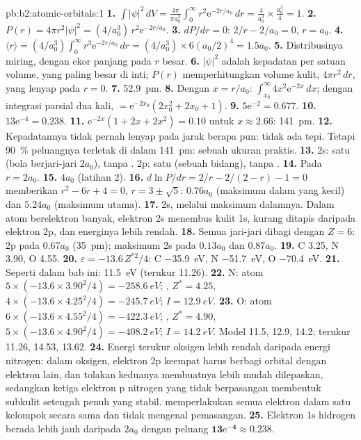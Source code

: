 \begin{solution}{pb:b2:atomic-orbitals:1}
\textbf{1.} $\int|\psi|^2\,dV = \frac{4\pi}{\pi a_0^3}\int_0^\infty r^2\mathrm e^{-2r/a_0}\,dr =
\frac{4}{a_0^3} \times \frac{a_0^3}{4} = 1$.
\textbf{2.} $P(r) = 4\pi r^2|\psi|^2 = (4/a_0^3)\,r^2\mathrm e^{-2r/a_0}$.
\textbf{3.} $dP/dr = 0$: $2/r - 2/a_0 = 0$, $r = a_0$.
\textbf{4.} $\langle r\rangle = (4/a_0^3)\int_0^\infty r^3\mathrm e^{-2r/a_0}\,dr = (4/a_0^3)
\times 6(a_0/2)^4 = 1.5a_0$.
\textbf{5.} Distribusinya miring, dengan ekor panjang pada $r$ besar.
\textbf{6.} $|\psi|^2$ adalah kepadatan per satuan volume, yang paling besar
di inti; $P(r)$ memperhitungkan volume kulit, $4\pi r^2\,dr$, yang lenyap
pada $r = 0$.
\textbf{7.} \qty{52.9}{pm}.
\textbf{8.} Dengan $x = r/a_0$: $\int_{x_0}^\infty 4x^2\mathrm e^{-2x}\,dx$;
dengan integrasi parsial dua kali, $= \mathrm e^{-2x_0}(2x_0^2 + 2x_0 + 1)$.
\textbf{9.} $5\mathrm e^{-2} = 0.677$.
\textbf{10.} $13\mathrm e^{-4} = 0.238$.
\textbf{11.} $\mathrm e^{-2x}(1 + 2x + 2x^2) = 0.10$ untuk $x \approx 2.66$:
\qty{141}{pm}.
\textbf{12.} Kepadatannya tidak pernah lenyap pada jarak berapa pun: tidak
ada tepi. Tetapi 90~\% peluangnya terletak di dalam \qty{141}{pm}: sebuah
ukuran praktis.
\textbf{13.} 2s: satu  (bola berjari-jari $2a_0$), tanpa . 2p: satu  (sebuah bidang), tanpa .
\textbf{14.} Pada $r = 2a_0$.
\textbf{15.} $4a_0$ (latihan 2).
\textbf{16.} $d\ln P/dr = 2/r - 2/(2 - r) - 1 = 0$ memberikan $r^2 - 6r + 4 = 0$,
$r = 3 \pm \sqrt5$: $0.76a_0$ (maksimum dalam yang kecil) dan $5.24a_0$
(maksimum utama).
\textbf{17.} 2s, melalui maksimum dalamnya. Dalam atom berelektron banyak,
elektron 2s menembus kulit 1s, kurang ditapis daripada elektron 2p, dan
energinya lebih rendah.
\textbf{18.} Semua jari-jari dibagi dengan $Z = 6$: 2p pada $0.67a_0$
(\qty{35}{pm}); maksimum 2s pada $0.13a_0$ dan $0.87a_0$.
\textbf{19.} C 3.25, N 3.90, O 4.55.
\textbf{20.} $\varepsilon = -13.6\,Z^{*2}/4$: C \qty{-35.9}{eV}, N \qty{-51.7}{eV}, O
\qty{-70.4}{eV}.
\textbf{21.} Seperti dalam bab ini: \qty{11.5}{eV} (terukur 11.26).
\textbf{22.} N: atom $5 \times (-13.6 \times 3.90^2/4) = \qty{-258.6}{eV}$; , $Z^* =
4.25$, $4 \times (-13.6 \times 4.25^2/4) = \qty{-245.7}{eV}$; $I = \qty{12.9}{eV}$.
\textbf{23.} O: atom $6 \times (-13.6 \times 4.55^2/4) = \qty{-422.3}{eV}$; , $Z^* =
4.90$, $5 \times (-13.6 \times 4.90^2/4) = \qty{-408.2}{eV}$; $I = \qty{14.2}{eV}$.
Model 11.5, 12.9, 14.2; terukur 11.26, 14.53, 13.62.
\textbf{24.} Energi terukur oksigen lebih rendah daripada energi nitrogen:
dalam oksigen, elektron 2p keempat harus berbagi orbital dengan elektron
lain, dan tolakan keduanya membuatnya lebih mudah dilepaskan, sedangkan
ketiga elektron p nitrogen yang tidak berpasangan membentuk subkulit
setengah penuh yang stabil.  memperlakukan semua elektron
dalam satu kelompok secara sama dan tidak mengenal pemasangan.
\textbf{25.} Elektron 1s hidrogen berada lebih jauh daripada $2a_0$ dengan
peluang $\boldsymbol{13\mathrm e^{-4} \approx 0.238}$.
\end{solution}
